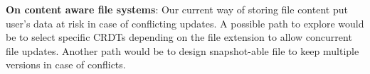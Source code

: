 \documentclass[sigconf, anonymous, 10pt]{acmart}
\begin{document}
\textbf{On content aware file systems}: Our current way of storing file content put user's data at risk in case of conflicting updates. A possible path to explore would be to select specific CRDTs depending on the file extension to allow concurrent file updates. Another path would be to design snapshot-able file to keep multiple versions in case of conflicts.



\end{document}
